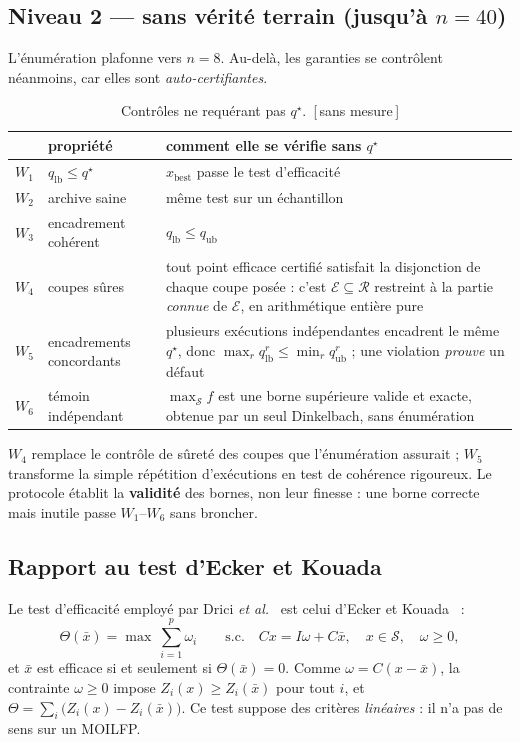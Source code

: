 \documentclass[11pt,a4paper]{article}
\theoremstyle{plain}
\theoremstyle{remark}
\newcommand{\Ecal}{\mathcal{E}}
\newcommand{\Scal}{\mathcal{S}}
\newcommand{\Rcal}{\mathcal{R}}
\newcommand{\qs}{q^{\star}}
\newcommand{\confna}{\textsf{\footnotesize[\,sans mesure\,]}}
\begin{document}
\subsection{Niveau 2 --- sans vérité terrain (jusqu'à $n=40$)}
\label{sec:w}

L'énumération plafonne vers $n=8$. Au-delà, les garanties se contrôlent
néanmoins, car elles sont \emph{auto-certifiantes}.

\begin{table}[H]
\centering
\caption{Contrôles ne requérant pas $\qs$.\ \confna}
\begin{tabular}{clp{9.6cm}}
\toprule
& propriété & comment elle se vérifie sans $\qs$\\
\midrule
$W_1$ & $q_{\text{lb}}\le\qs$ & $x_{\text{best}}$ passe le test d'efficacité\\
$W_2$ & archive saine & même test sur un échantillon\\
$W_3$ & encadrement cohérent & $q_{\text{lb}}\le q_{\text{ub}}$\\
$W_4$ & coupes sûres & tout point efficace certifié satisfait la disjonction
        de chaque coupe posée : c'est $\Ecal\subseteq\Rcal$ restreint à la
        partie \emph{connue} de $\Ecal$, en arithmétique entière pure\\
$W_5$ & encadrements concordants & plusieurs exécutions indépendantes
        encadrent le même $\qs$, donc
        $\max_r q_{\text{lb}}^r\le\min_r q_{\text{ub}}^r$ ; une violation
        \emph{prouve} un défaut\\
$W_6$ & témoin indépendant & $\max_{\Scal}f$ est une borne supérieure valide
        et exacte, obtenue par un seul Dinkelbach, sans énumération\\
\bottomrule
\end{tabular}
\end{table}

\noindent
$W_4$ remplace le contrôle de sûreté des coupes que l'énumération assurait ;
$W_5$ transforme la simple répétition d'exécutions en test de cohérence
rigoureux. Le protocole établit la \textbf{validité} des bornes, non leur
finesse : une borne correcte mais inutile passe $W_1$--$W_6$ sans broncher.

\subsection{Rapport au test d'Ecker et Kouada}
\label{sec:ecker}

Le test d'efficacité employé par Drici \emph{et al.}~\cite{drici2018} est
celui d'Ecker et Kouada~\cite{ecker1975} :
\[
  \Theta(\bar x)=\max\ \sum_{i=1}^{p}\omega_i
  \qquad\text{s.c.}\quad Cx=I\omega+C\bar x,\quad x\in\Scal,\quad \omega\ge 0,
\]
et $\bar x$ est efficace si et seulement si $\Theta(\bar x)=0$. Comme
$\omega=C(x-\bar x)$, la contrainte $\omega\ge 0$ impose
$Z_i(x)\ge Z_i(\bar x)$ pour tout $i$, et
$\Theta=\sum_i\bigl(Z_i(x)-Z_i(\bar x)\bigr)$. Ce test suppose des critères
\emph{linéaires} : il n'a pas de sens sur un MOILFP.
\end{document}
